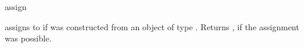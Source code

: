 \begin{ccRefFunction}{assign}


       {assigns  to  if 
        was constructed from an object of type .
        Returns , if the assignment was possible.}

\ccSeeAlso
{} \\
 \\

\end{ccRefFunction}

